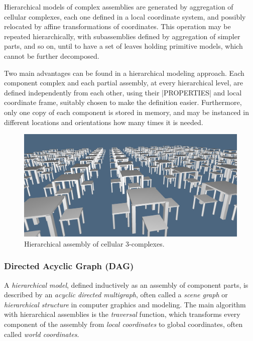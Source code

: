 \begin{coding}
Hierarchical models of complex assemblies are generated by aggregation of cellular complexes, each one defined in a local coordinate system, and possibly
relocated by affine transformations of coordinates.  This operation may be repeated
hierarchically, with subassemblies defined by aggregation of simpler parts, and so
on, until to have a set of leaves holding primitive models, which cannot be further decomposed.

Two main advantages can be found in a hierarchical modeling approach. Each component complex  and each partial assembly, at every hierarchical level, are defined independently from each other, using their |PROPERTIES| and local coordinate frame, suitably chosen to make the  definition easier.
Furthermore, only one copy of each component is stored in memory, and may be instanced
in different locations and orientations how many times it is needed.

\begin{figure}[htbp] %
   \includegraphics[width=\linewidth]{chapter-04/figs/refectory.png}
   \hspace{5mm}
   \caption{Hierarchical assembly of cellular 3-complexes.}
   \label{fig:refectory}
\end{figure}  


\subsubsection*{Directed Acyclic Graph (DAG)}\label{sect:4-3-2-1}

A \emph{hierarchical model}, defined inductively as an assembly of component parts,
is described by an \emph{acyclic directed multigraph}, often called a \emph{scene graph} or \emph{hierarchical structure} in computer graphics and modeling.  The main algorithm with hierarchical assemblies is the \emph{traversal} function, which transforms every component of the assembly from \emph{local coordinates} to global coordinates, often called \emph{world coordinates}.


\end{coding}
